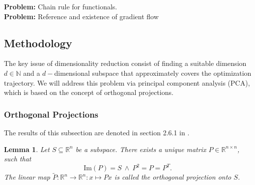 \documentclass[11pt, a4paper]{article}
\newtheorem{lemma}[theorem]{Lemma}
\newcommand{\N}{\mathds{N}}
\newcommand{\R}{\mathds{R}}
\begin{document}
\textbf{Problem:} Chain rule for functionals. \\
\textbf{Problem:} Reference and existence of gradient flow

\pagebreak
\subsection{Methodology}

The key issue of dimensionality reduction consist of finding a suitable dimension $d \in \N$ and a $d-$dimensional subspace that approximately covers the optimization trajectory. We will address this problem via principal component analysis (PCA), which is based on the concept of orthogonal projections.

\subsubsection{Orthogonal Projections}

The results of this subsection are denoted in section 2.6.1 in \cite{SVD}.

\begin{lemma} \label{lem:orthProjection}
Let $S \subseteq \R^n$ be a subspace. There exists a unique matrix $P \in \R^{n \times n}$, such that
\[ \text{Im}(P) = S \ \wedge \ P^2 = P = P^T. \]
 The linear map $\tilde{P} : \R^n \to \R^n : x \mapsto Px$ is called the orthogonal projection onto $S$.
\end{lemma}
\end{document}
